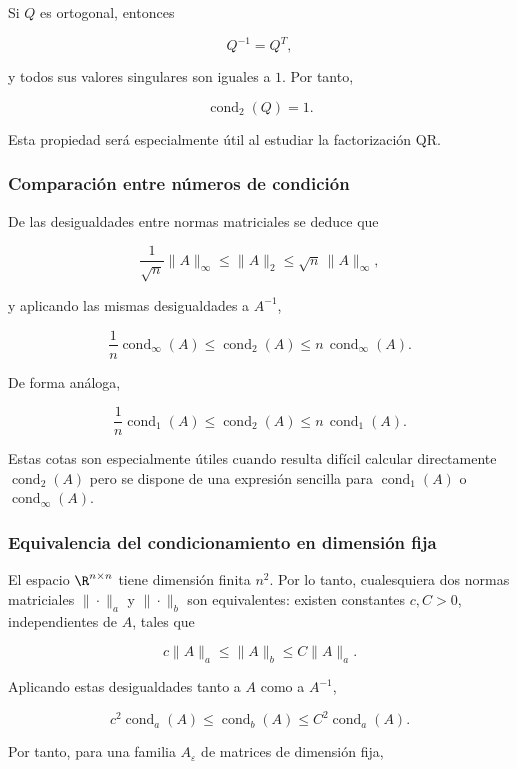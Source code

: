 \documentclass[12pt]{article}
\DeclareMathOperator{\cond}{cond}
\begin{document}
\begin{observacion}
Si $Q$ es ortogonal, entonces

\[
    Q^{-1}=Q^T,
\]

y todos sus valores singulares son iguales a $1$. Por tanto,

\[
    \boxed{\cond_2(Q)=1.}
\]

Esta propiedad será especialmente útil al estudiar la factorización
QR.
\end{observacion}


\subsubsection*{Comparación entre números de condición}

De las desigualdades entre normas matriciales se deduce que

\[
    \frac{1}{\sqrt n}\|A\|_\infty
    \leq
    \|A\|_2
    \leq
    \sqrt n\,\|A\|_\infty,
\]

y aplicando las mismas desigualdades a $A^{-1}$,

\[
    \boxed{
    \frac{1}{n}\cond_\infty(A)
    \leq
    \cond_2(A)
    \leq
    n\,\cond_\infty(A).
    }
\]

De forma análoga,

\[
    \boxed{
    \frac{1}{n}\cond_1(A)
    \leq
    \cond_2(A)
    \leq
    n\,\cond_1(A).
    }
\]

Estas cotas son especialmente útiles cuando resulta difícil calcular
directamente $\cond_2(A)$ pero se dispone de una expresión sencilla
para $\cond_1(A)$ o $\cond_\infty(A)$.


\subsubsection*{Equivalencia del condicionamiento en dimensión fija}

El espacio $\R^{n\times n}$ tiene dimensión finita $n^2$. Por lo tanto,
cualesquiera dos normas matriciales $\|\cdot\|_a$ y $\|\cdot\|_b$
son equivalentes: existen constantes $c,C>0$, independientes de $A$,
tales que

\[
    c\|A\|_a
    \leq
    \|A\|_b
    \leq
    C\|A\|_a.
\]

Aplicando estas desigualdades tanto a $A$ como a $A^{-1}$,

\[
    c^2\cond_a(A)
    \leq
    \cond_b(A)
    \leq
    C^2\cond_a(A).
\]

Por tanto, para una familia $A_\varepsilon$ de matrices de dimensión
fija,
\end{document}
